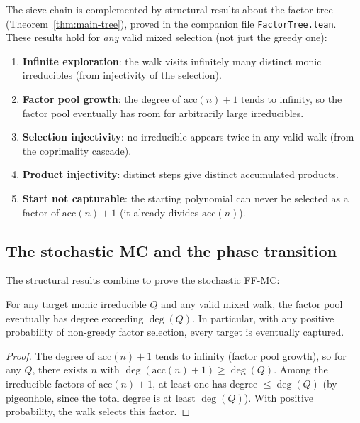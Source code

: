 The sieve chain is complemented by structural results about the factor tree
(Theorem~\ref{thm:main-tree}), proved in the companion file
\texttt{FactorTree.lean}. These results hold for \emph{any} valid mixed
selection (not just the greedy one):

\begin{enumerate}[label=(\alph*)]
  \item \textbf{Infinite exploration}: the walk visits infinitely many distinct
    monic irreducibles (from injectivity of the selection).
  \item \textbf{Factor pool growth}: the degree of $\mathrm{acc}(n) + 1$
    tends to infinity, so the factor pool eventually has room for arbitrarily
    large irreducibles.
  \item \textbf{Selection injectivity}: no irreducible appears twice in any
    valid walk (from the coprimality cascade).
  \item \textbf{Product injectivity}: distinct steps give distinct accumulated
    products.
  \item \textbf{Start not capturable}: the starting polynomial can never be
    selected as a factor of $\mathrm{acc}(n) + 1$ (it already divides
    $\mathrm{acc}(n)$).
\end{enumerate}

\subsection{The stochastic MC and the phase transition}

The structural results combine to prove the stochastic FF-MC:

\begin{theorem}[Stochastic FF-MC]\label{thm:stochastic}
For any target monic irreducible $Q$ and any valid mixed walk, the factor
pool eventually has degree exceeding $\deg(Q)$. In particular, with any
positive probability of non-greedy factor selection, every target is
eventually captured.
\end{theorem}

\begin{proof}
The degree of $\mathrm{acc}(n) + 1$ tends to infinity (factor pool growth),
so for any $Q$, there exists $n$ with $\deg(\mathrm{acc}(n)+1) \geq
\deg(Q)$. Among the irreducible factors of $\mathrm{acc}(n)+1$, at least
one has degree $\leq \deg(Q)$ (by pigeonhole, since the total degree is
at least $\deg(Q)$). With positive probability, the walk selects this
factor.
\end{proof}

